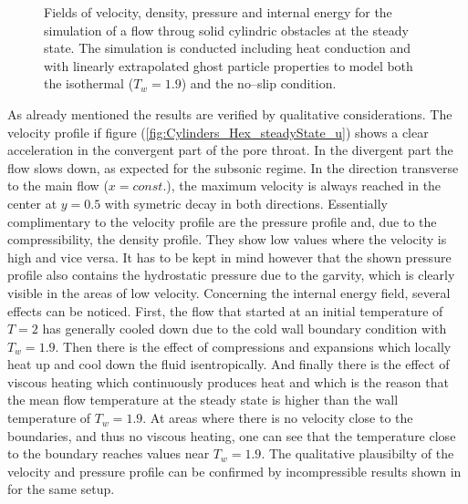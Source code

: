 \documentclass[11pt,a4paper,twoside]{report}
\begin{document}
\begin{figure}[h]
\caption[Property fields for Porosity]{Fields of velocity, density, pressure and internal energy for the simulation of a flow throug solid cylindric obstacles at the steady state. The simulation is conducted including heat conduction and with linearly extrapolated ghost particle properties to model both the isothermal ($T_w=1.9$) and the no--slip condition.}

\end{figure}



As already mentioned the results are verified by qualitative considerations. 
The velocity profile if figure (\ref{fig:Cylinders_Hex_steadyState_u}) shows a clear acceleration in the convergent part of the pore throat. In the divergent part the flow slows down, as expected for the subsonic regime. In the direction transverse to the main flow ($x=const.$), the maximum velocity is always reached in the center at $y=0.5$ with symetric decay in both directions. 
Essentially complimentary to the velocity profile are the pressure profile and, due to the compressibility, the density profile. They show low values where the velocity is high and vice versa. It has to be kept in mind however that the shown pressure profile also contains the hydrostatic pressure due to the garvity, which is clearly visible in the areas of low velocity.
Concerning the internal energy field, several effects can be noticed. First, the flow that started at an initial temperature of $T=2$ has generally cooled down due to the cold wall boundary condition with $T_w=1.9$. Then there is the effect of compressions and expansions which locally heat up and cool down the fluid isentropically. And finally there is the effect of viscous heating which continuously produces heat and which is the reason that the mean flow temperature at the steady state is higher than the wall temperature of $T_w=1.9$. At areas where there is no velocity close to the boundaries, and thus no viscous heating, one can see that the temperature close to the boundary reaches values near $T_w=1.9$. %
The qualitative plausibilty of the velocity and pressure profile can be confirmed by incompressible results shown in \cite{Zhu1999} for the same setup. 
 
\end{document}
